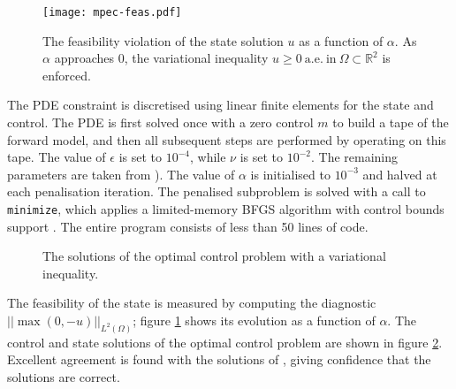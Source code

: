 \documentclass[prodmode,acmtoms]{acmsmall}
\begin{document}
\begin{figure}
        \centering
        \texttt{[image: mpec-feas.pdf]}
        \caption{The feasibility violation of the state solution $u$ as a function of $\alpha$. As $\alpha$ approaches 0, the variational inequality
        $u \ge 0\  \mathrm{a.e.\ in}\ \Omega \subset \mathbb R^2$ is enforced.}
        \label{fig:mpec_feasibility}
\end{figure}

The PDE constraint is discretised using linear finite elements for the state and control. The PDE is first solved once with a zero control
$m$ to build a tape of the forward model, and then all subsequent steps are performed by operating on this tape. The value of $\epsilon$ is set to
$10^{-4}$, while $\nu$ is set to $10^{-2}$. The remaining parameters are taken from ). The value of $\alpha$ is initialised
to $10^{-3}$ and halved at each penalisation iteration. The penalised subproblem is solved with a call to \texttt{minimize}, which applies
a limited-memory BFGS algorithm with control bounds support \cite{zhu1997b}. The entire program consists of less than 50 lines of code.

\begin{figure}
\centering
        \caption{The solutions of the optimal control problem with a variational inequality.}
        \label{fig:mpec_solutions}
\end{figure}

The feasibility of the state is measured by computing the diagnostic
$\left|\left| \max{(0, -u)} \right| \right|_{L^2(\Omega)}$; figure \ref{fig:mpec_feasibility} shows its evolution as a function of $\alpha$. 
The control and state solutions of the optimal control problem
are shown in figure \ref{fig:mpec_solutions}. Excellent agreement is found with the solutions of , giving confidence
that the solutions are correct.
\end{document}
